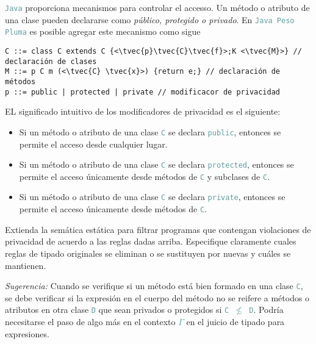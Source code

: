 \documentclass{article}
\newcommand{\tx}[1]{\textcolor{Black} {\texttt{#1}}}
\newcommand{\tp}[1]{\textcolor{CadetBlue} {\texttt{#1}}}
\newcommand{\ti}[1]{\textcolor{RoyalPurple} {\textit{#1}}}
\newcommand{\tvec}[1]{$\vec{\tx{#1}}$ }
\begin{document}
\begin{enumerate}
        \tp{Java} proporciona mecanismos para controlar el accesso. Un método o
        atributo de una clase pueden declararse como \ti{público, protegido o
        privado}. En \tp{Java Peso Pluma} es posible agregar este mecanismo como
        sigue

        \begin{verbatim}
C ::= class C extends C {<\tvec{p}\tvec{C}\tvec{f}>;K <\tvec{M}>} // declaración de clases
M ::= p C m (<\tvec{C} \tvec{x}>) {return e;} // declaración de métodos
p ::= public | protected | private // modificacor de privacidad
        \end{verbatim}

        EL significado intuitivo de los modificadores de privacidad es el
        siguiente:

        \begin{itemize}
            \item Si un método o atributo de una clase \tp{C} se declara
            \tp{public}, entonces se permite el acceso desde cualquier lugar.

            \item Si un método o atributo de una clase \tp{C} se declara
            \tp{protected}, entonces se permite el acceso únicamente desde
            métodos de \tp{C} y subclases de \tp{C}.

            \item Si un método o atributo de una clase \tp{C} se declara
            \tp{private}, entonces se permite el acceso únicamente desde
            métodos de \tp{C}.
        \end{itemize}

        Extienda la semática estática para filtrar programas que contengan
        violaciones de privacidad de acuerdo a las reglas dadas arriba.
        Especifique claramente cuales reglas de tipado originales se eliminan o
        se sustituyen por nuevas y cuáles se mantienen.

        \ti{Sugerencia:} Cuando se verifique si un método está bien formado en
        una clase \tp{C}, se debe verificar si la expresión en el cuerpo del
        método no se reifere a métodos o atributos en otra clase \tp{D} que sean
        privados o protegidos si \tp{C $\not \leq$ D}. Podría necesitarse el
        paso de algo más en el contexto \tp{$\Gamma$} en el juicio de tipado
        para expresiones.

    \end{enumerate}
\end{document}
